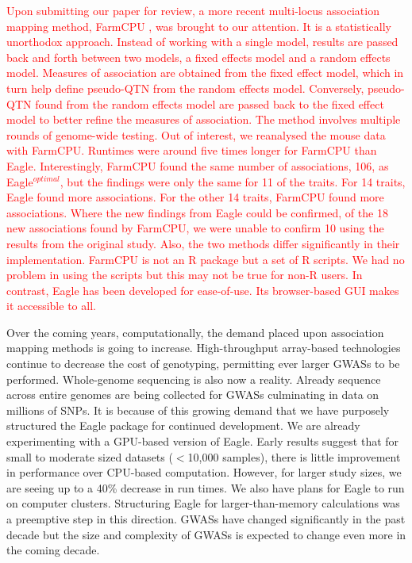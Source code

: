 \documentclass{bioinfo}
\begin{document}
\textcolor{red}{
Upon submitting our paper for review, a more recent multi-locus association mapping method, FarmCPU \citep{liu2016iterative}, was brought to our attention. 
It is a statistically unorthodox approach. Instead of working with a single model, results are passed back and forth between two models, 
a fixed effects model and a random effects model. Measures of association are obtained from the fixed effect model, which in turn 
help define pseudo-QTN from the random effects model. Conversely, pseudo-QTN found from the random effects model are passed 
back to the fixed effect model to better refine the measures of association.  The method involves multiple rounds of genome-wide 
testing. Out of interest, we reanalysed the mouse data with FarmCPU.  Runtimes were around five times longer for FarmCPU than 
Eagle.  Interestingly, FarmCPU found the same number of associations, 106,  as Eagle$^{optimal}$, but the findings were only the 
same for 11 of the traits.  For 14 traits, Eagle found more associations. For the other 14 traits, FarmCPU found more associations. 
Where the new findings from Eagle could 
be confirmed, of the 18 new associations found by FarmCPU, we were unable to confirm 10 using the results from the original study. 
Also, the two methods differ significantly in their implementation. FarmCPU is not an R package but a set of R scripts. We had 
no problem in using the scripts but this may not be true for non-R users. In contrast, Eagle has been developed for ease-of-use.
Its browser-based GUI makes it accessible to all.
}

Over the coming years, computationally, the demand placed upon association mapping methods is going to increase. 
High-throughput array-based technologies continue to decrease the cost of genotyping, permitting ever larger GWASs to be performed. 
Whole-genome sequencing is also now a reality. Already sequence across entire genomes are being collected for GWASs \citep{gudbjartsson2015large, long2017whole}
culminating in data on millions of SNPs. It is because of this growing demand that 
we have purposely structured the Eagle package for continued development. We are already experimenting with a GPU-based version of Eagle. 
Early results suggest that for small to moderate sized datasets ($<$10,000 samples), there is little improvement in performance over CPU-based 
computation.  However, for larger study sizes, we are seeing up to a 40\% decrease in run times.  
We also have plans for Eagle to run on computer clusters. Structuring Eagle for larger-than-memory calculations was a 
preemptive step in this direction. GWASs have changed significantly in the past decade but the size and complexity of GWASs is expected 
to change even more in the coming decade. 
\end{document}
